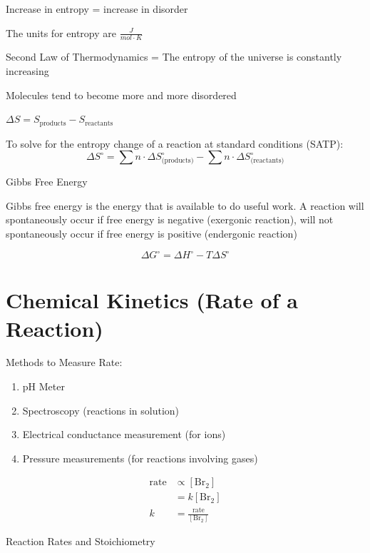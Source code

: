 \documentclass[11pt]{article}
\begin{document}
Increase in entropy = increase in disorder

The units for entropy are $\frac{J}{mol\cdot K}$

\newline\noindent Second Law of Thermodynamics = The entropy of the universe is constantly increasing

Molecules tend to become more and more disordered

$\Delta S = S_{\text{products}} - S_{\text{reactants}}$

\newline\noindent To solve for the entropy change of a reaction at standard conditions (SATP):
\begin{equation}
    \Delta S^\circ = \sum{n\cdot \Delta S^\circ_{\text{(products)}}} - \sum{n\cdot \Delta S^\circ_{\text{(reactants)}}}
\end{equation}

\noindent Gibbs Free Energy

Gibbs free energy is the energy that is available to do useful work. A reaction will spontaneously occur if free energy is negative (exergonic reaction), will not spontaneously occur if free energy is positive (endergonic reaction)

\begin{equation}
    \Delta G^\circ = \Delta H^\circ - T\Delta S^\circ
\end{equation}


\section{Chemical Kinetics (Rate of a Reaction)}
Methods to Measure Rate:
\begin{enumerate}
    \item pH Meter
    \item Spectroscopy (reactions in solution)
    \item Electrical conductance measurement (for ions)
    \item Pressure measurements (for reactions involving gases) 
\end{enumerate}

\begin{align}
    \text{rate} &\propto [\text{Br}_2]\\
    &= k[\text{Br}_2]\\
    k&=\frac{\text{rate}}{[\text{Br}_2]}
\end{align}

\noindent Reaction Rates and Stoichiometry
\end{document}
